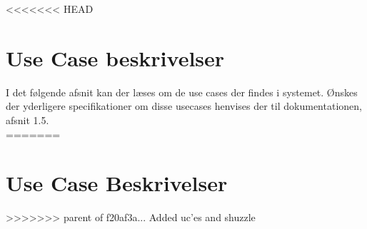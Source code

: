 <<<<<<< HEAD
\section{Use Case beskrivelser}

I det følgende afsnit kan der læses om de use cases der findes i systemet. Ønskes der yderligere specifikationer om disse usecases henvises der til dokumentationen, afsnit 1.5. \\









=======
\section{Use Case Beskrivelser}
>>>>>>> parent of f20af3a... Added uc'es and shuzzle
